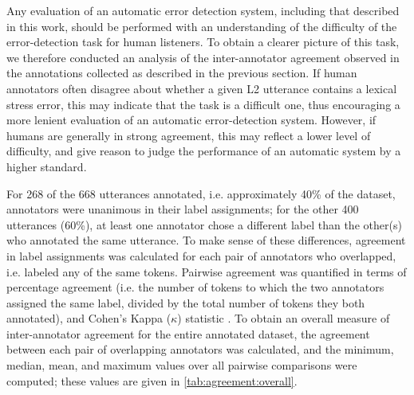 \documentclass[a4paper]{article}
\begin{document}
		Any evaluation of an automatic error detection system, including that described in this work, should be performed with an understanding of the difficulty of the error-detection task for human listeners. To obtain a clearer picture of this task, we therefore conducted an analysis of the inter-annotator agreement observed in the annotations collected as described in the previous section. If human annotators often disagree about whether a given L2 utterance contains a lexical stress error, this may indicate that the task is a difficult one, thus encouraging a more lenient evaluation of an automatic error-detection system. However, if humans are generally in strong agreement, this may reflect a lower level of difficulty, and give reason to judge the performance of an automatic system by a higher standard. 
		
		
		For 268 of the 668 utterances annotated, i.e. approximately 40\% of the dataset, annotators were unanimous in their label assignments; for the other 400 utterances (60\%), at least one annotator chose a different label than the other(s) who annotated the same utterance.
		To make sense of these differences, agreement in label assignments was calculated for each pair of annotators who overlapped, i.e. labeled any of the same tokens. 
		Pairwise agreement was quantified in terms of percentage agreement (i.e. the number of tokens to which the two annotators assigned the same label, divided by the total number of tokens they both annotated), and Cohen's Kappa ($\kappa$) statistic \cite{Cohen1960}.
		To obtain an overall measure of inter-annotator agreement for the entire annotated dataset, the agreement between each pair of overlapping annotators was calculated, and the minimum, median, mean, and maximum values over all pairwise comparisons were computed; these values are given in \cref{tab:agreement:overall}.
		
\end{document}
